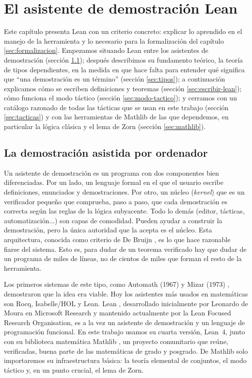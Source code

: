 \chapter{El asistente de demostración Lean}\label{sec:lean}

Este capítulo presenta Lean con un criterio concreto: explicar lo aprendido en el manejo de la herramienta y lo necesario para la formalización del capítulo \ref{sec:formalizacion}. Empezamos situando Lean entre los asistentes de demostración (sección \ref{sec:itp}); después describimos su fundamento teórico, la teoría de tipos dependientes, en la medida en que hace falta para entender qué significa que ``una demostración es un término'' (sección \ref{sec:tipos}); a continuación explicamos cómo se escriben definiciones y teoremas (sección \ref{sec:escribir-lean}); cómo funciona el modo táctico (sección \ref{sec:modo-tactico}); y cerramos con un catálogo razonado de todas las tácticas que se usan en este trabajo (sección \ref{sec:tacticas}) y con las herramientas de Mathlib de las que dependemos, en particular la lógica clásica y el lema de Zorn (sección \ref{sec:mathlib}).

\section{La demostración asistida por ordenador}\label{sec:itp}

Un asistente de demostración es un programa con dos componentes bien diferenciadas. Por un lado, un lenguaje formal en el que el usuario escribe definiciones, enunciados y demostraciones. Por otro, un núcleo (\emph{kernel}) que es un verificador pequeño que comprueba, paso a paso, que cada demostración es correcta según las reglas de la lógica subyacente. Todo lo demás (editor, tácticas, automatización...) son capas de comodidad. Pueden ayudar a construir la demostración, pero la única autoridad que la acepta es el núcleo. Esta arquitectura, conocida como criterio de De Bruijn \cite{barendregtwiedijk}, es lo que hace razonable fiarse del sistema. Esto es, para dudar de un teorema verificado hay que dudar de un programa de miles de líneas, no de cientos de miles que forman el resto de la herramienta.

Los primeros sistemas de este tipo, como Automath (1967) \cite{automath} y Mizar (1973) \cite{mizar}, demostraron que la idea era viable. Hoy los asistentes más usados en matemáticas son Rocq, Isabelle/HOL y Lean. Lean \cite{lean4}, desarrollado inicialmente por Leonardo de Moura en Microsoft Research y mantenido actualmente por la Lean Focused Research Organisation, es a la vez un asistente de demostración y un lenguaje de programación funcional. En este trabajo usamos su cuarta versión, Lean~4, junto con su biblioteca matemática Mathlib \cite{mathlib}, un proyecto comunitario que reúne, verificadas, buena parte de las matemáticas de grado y posgrado. De Mathlib solo importaremos su infraestructura básica: la teoría elemental de conjuntos, el modo táctico y, en un punto crucial, el lema de Zorn.

